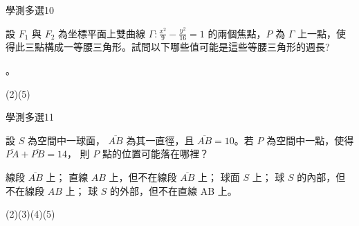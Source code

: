     \begin{QUESTION}
        \begin{ExamInfo}{94}{學測}{多選}{10}
        \end{ExamInfo}
        \begin{ExamAnsRateInfo}{29}{47}{23}{17}
        \end{ExamAnsRateInfo}
        \begin{QBODY}
            設 $F_1$ 與 $F_2$ 為坐標平面上雙曲線 $\Gamma : \frac{x^2}{9} -\frac{y^2}{16} =1$ 的兩個焦點，$P$ 為 $\Gamma$ 上一點，使得此三點構成一等腰三角形。試問以下哪些值可能是這些等腰三角形的週長? 
			\begin{QOPS} 
				 。
			\end{QOPS}
        \end{QBODY}
        \begin{QFROMS}
        \end{QFROMS}
        \begin{QTAGS}\end{QTAGS}
        \begin{QANS}
            (2)(5)
        \end{QANS}
        \begin{QSOLLIST}
        \end{QSOLLIST}
        \begin{QEMPTYSPACE}
        \end{QEMPTYSPACE}
    \end{QUESTION}
    \begin{QUESTION}
        \begin{ExamInfo}{94}{學測}{多選}{11}
        \end{ExamInfo}
        \begin{ExamAnsRateInfo}{32}{51}{30}{15}
        \end{ExamAnsRateInfo}
        \begin{QBODY}
            設 $S$ 為空間中一球面， $\overline{AB}$ 為其一直徑，且 $\overline{AB} =10$。若 $ P$ 為空間中一點，使得 $\overline{PA} + \overline{PB} = 14$， 則 $P$ 點的位置可能落在哪裡？ 
			\begin{QOPS} 
				\QOP 線段 $\overline{AB}$ 上； 
				\QOP 直線 $AB$ 上，但不在線段 $\overline{AB}$ 上； 
				\QOP	球面 $S$ 上； 
				\QOP 球 $S$ 的內部，但不在線段 $AB$ 上； 
				\QOP 球 $S$ 的外部，但不在直線 AB 上。
			\end{QOPS}
        \end{QBODY}
        \begin{QFROMS}
        \end{QFROMS}
        \begin{QTAGS}\end{QTAGS}
        \begin{QANS}
            (2)(3)(4)(5)
        \end{QANS}
        \begin{QSOLLIST}
        \end{QSOLLIST}
        \begin{QEMPTYSPACE}
        \end{QEMPTYSPACE}
    \end{QUESTION}
